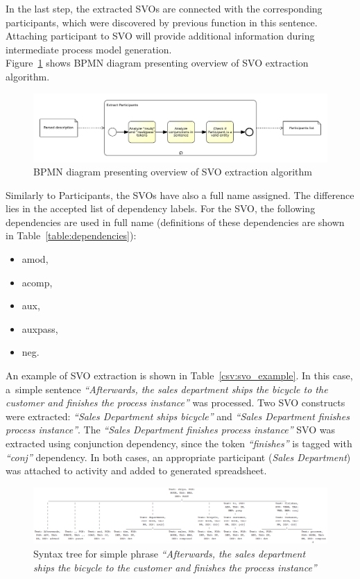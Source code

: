 In the last step, the extracted SVOs are connected with the corresponding participants, which were discovered by previous function in this sentence. Attaching participant to SVO will provide additional information during intermediate process model generation.\\
Figure~\ref{fig:svo_extraction_subprocess} shows BPMN diagram presenting overview of SVO extraction algorithm.
\begin{figure}[H]
	\centering
	\includegraphics[width=\textwidth]{./images/participant_extraction_subprocess.pdf}
	\caption{BPMN diagram presenting overview of SVO extraction algorithm}
	\label{fig:svo_extraction_subprocess}
\end{figure}
Similarly to Participants, the SVOs have also a full name assigned. The difference lies in the accepted list of dependency labels. For the SVO, the following dependencies are used in full name (definitions of these dependencies are shown in Table~\ref{table:dependencies}):
\begin{itemize}
	\item amod, 
	\item acomp, 
	\item aux,
	\item auxpass,
	\item neg.
\end{itemize}
An example of SVO extraction is shown in Table~\ref{csv:svo_example}. In this case, a~simple sentence \emph{``Afterwards, the sales department ships the bicycle to the customer and finishes the process instance''} was processed. Two SVO constructs were extracted: \emph{``Sales Department ships bicycle''} and \emph{``Sales Department finishes process instance''}. The \emph{``Sales Department finishes process instance''} SVO was extracted using conjunction dependency, since the token \emph{``finishes''} is tagged with \emph{``conj''} dependency. In both cases, an appropriate participant (\emph{Sales Department}) was attached to activity and added to generated spreadsheet.
\begin{figure}[H]
	\centering
	\includegraphics[width=\textwidth]{./images/svo_extraction_example.pdf}
	\caption{Syntax tree for simple phrase \emph{``Afterwards, the sales department ships the bicycle to the customer and finishes the process instance''}}
	\label{fig:svo_example}
\end{figure}
